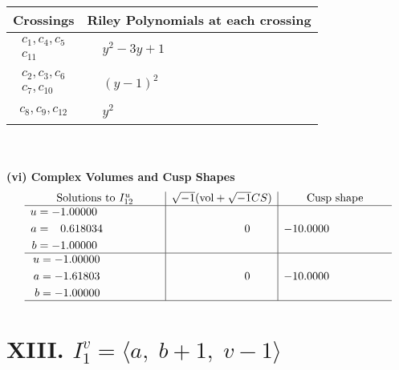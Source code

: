 \documentclass[1p]{elsarticle_modified}
\theoremstyle{definition}
\newcommand{\I}{\sqrt{-1}}
\begin{document}
\begin{tabular}{m{50pt}|m{274pt}}
Crossings & \hspace{64pt}Riley Polynomials at each crossing \\
\hline $$\begin{aligned}c_{1},c_{4},c_{5}\\c_{11}\end{aligned}$$&$\begin{aligned}
&y^2-3 y+1
\end{aligned}$\\
\hline $$\begin{aligned}c_{2},c_{3},c_{6}\\c_{7},c_{10}\end{aligned}$$&$\begin{aligned}
&(y-1)^2
\end{aligned}$\\
\hline $$\begin{aligned}c_{8},c_{9},c_{12}\end{aligned}$$&$\begin{aligned}
&y^2
\end{aligned}$\\
\hline
\end{tabular}\\~\\
\newpage\flushleft \textbf{(vi) Complex Volumes and Cusp Shapes}
$$\begin{array}{c|c|c}  
\text{Solutions to }I^u_{12}& \I (\text{vol} + \sqrt{-1}CS) & \text{Cusp shape}\\
 \hline 
\begin{aligned}
u &= -1.00000\phantom{ +0.000000I} \\
a &= \phantom{-}0.618034\phantom{ +0.000000I} \\
b &= -1.00000\phantom{ +0.000000I}\end{aligned}
 & \phantom{-0.000000 } 0 & -10.0000\phantom{ +0.000000I} \\ \hline\begin{aligned}
u &= -1.00000\phantom{ +0.000000I} \\
a &= -1.61803\phantom{ +0.000000I} \\
b &= -1.00000\phantom{ +0.000000I}\end{aligned}
 & \phantom{-0.000000 } 0 & -10.0000\phantom{ +0.000000I}\\
 \hline 
 \end{array}$$\newpage\newpage\renewcommand{\arraystretch}{1}
\centering \section*{XIII. $I^v_{1}= \langle a,\;b+1,\;v-1 \rangle$}
\end{document}
